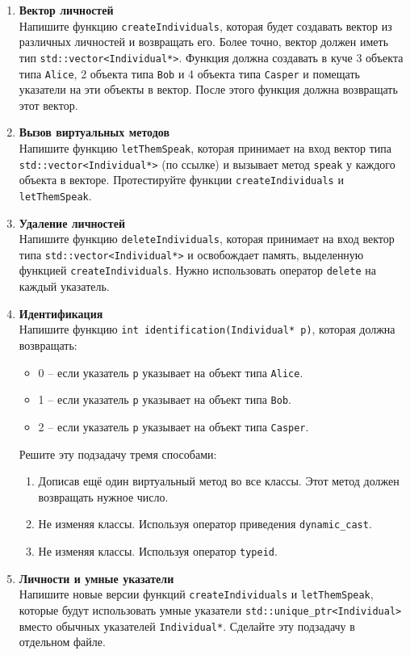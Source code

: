 \documentclass{article}
\begin{document}
\begin{enumerate}
\item \textbf{Вектор личностей}\\ 
Напишите функцию \texttt{createIndividuals}, которая будет создавать вектор из различных личностей и возвращать его. Более точно, вектор должен иметь тип \texttt{std::vector<Individual*>}. Функция должна создавать в куче 3 объекта типа \texttt{Alice}, 2 объекта типа \texttt{Bob} и 4 объекта типа \texttt{Casper} и помещать указатели на эти объекты в вектор. После этого функция должна возвращать этот вектор.


\item \textbf{Вызов виртуальных методов}\\
Напишите функцию \texttt{letThemSpeak}, которая принимает на вход вектор типа \texttt{std::vector<Individual*>} (по ссылке) и вызывает метод \texttt{speak} у каждого объекта в векторе. Протестируйте функции \texttt{createIndividuals} и \texttt{letThemSpeak}.


\item \textbf{Удаление личностей}\\ 
Напишите функцию \texttt{deleteIndividuals}, которая принимает на вход вектор типа \texttt{std::vector<Individual*>} и освобождает память, выделенную функцией \texttt{createIndividuals}. Нужно использовать оператор \texttt{delete} на каждый указатель. 


\item \textbf{Идентификация}\\
Напишите функцию \texttt{int identification(Individual* p)}, которая должна возвращать:
\begin{itemize}
\item 0 -- если указатель \texttt{p} указывает на объект типа \texttt{Alice}.
\item 1 -- если указатель \texttt{p} указывает на объект типа \texttt{Bob}.
\item 2 -- если указатель \texttt{p} указывает на объект типа \texttt{Casper}.
\end{itemize}
Решите эту подзадачу тремя способами:

\begin{enumerate}
\item Дописав ещё один виртуальный метод во все классы. Этот метод должен возвращать нужное число.
\item Не изменяя классы. Используя оператор приведения \texttt{dynamic\_cast}.
\item Не изменяя классы. Используя оператор \texttt{typeid}.
\end{enumerate}


\item \textbf{Личности и умные указатели}\\
Напишите новые версии функций \texttt{createIndividuals} и \texttt{letThemSpeak}, которые будут использовать умные указатели \texttt{std::unique\_ptr<Individual>} вместо обычных указателей \texttt{Individual*}. Сделайте эту подзадачу в отдельном файле.

\end{enumerate}
\end{document}
